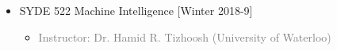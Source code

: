 \documentclass[10pt,a4paper,sans]{moderncv} %
\begin{document}
\begin{itemize}
            \item {} SYDE 522 Machine Intelligence \hfill[Winter 2018-9]
			\begin{itemize}
				\item \textcolor{gray}{Instructor: Dr. Hamid R. Tizhoosh (University of Waterloo)}
			\end{itemize}

%			
%			
%			
%			
			
		\end{itemize}
	
\end{document}
